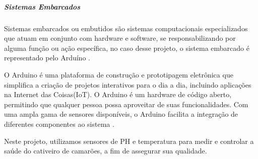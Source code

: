 \subparagraph*{\textbf{Sistemas Embarcados}}
 
Sistemas embarcados ou embutidos são sistemas computacionais especializados que atuam em conjunto com hardware e software, se responsabilizando por alguma função ou ação específica, no caso desse projeto, o sistema embarcado é representado pelo Arduíno \cite{souza2022}. 

O Arduino é uma plataforma de construção e prototipagem eletrônica que simplifica a criação de projetos interativos para o dia a dia, incluindo aplicações na Internet das Coisas(IoT). O Arduino é um hardware de código aberto, permitindo que qualquer pessoa possa aproveitar de suas funcionalidades. Com uma ampla gama de sensores disponíveis, o Arduino facilita a integração de diferentes componentes ao sistema \cite{thomsen2023}.

Neste projeto, utilizamos sensores de PH e temperatura para medir e controlar a saúde do cativeiro de camarões, a fim de assegurar sua qualidade.  

 

 